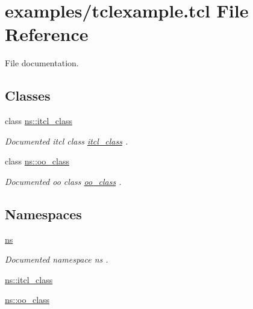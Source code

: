 \hypertarget{tclexample_8tcl}{}\section{examples/tclexample.tcl File Reference}
\label{tclexample_8tcl}


File documentation.  


\subsection*{Classes}
\begin{DoxyCompactItemize}
\item 
class \mbox{\hyperlink{classns_1_1itcl__class}{ns\+::itcl\+\_\+class}}
\begin{DoxyCompactList}\small\item\em Documented itcl class {\ttfamily \mbox{\hyperlink{classns_1_1itcl__class}{itcl\+\_\+class}}} . \end{DoxyCompactList}\item 
class \mbox{\hyperlink{classns_1_1oo__class}{ns\+::oo\+\_\+class}}
\begin{DoxyCompactList}\small\item\em Documented oo class {\ttfamily \mbox{\hyperlink{classns_1_1oo__class}{oo\+\_\+class}}} . \end{DoxyCompactList}\end{DoxyCompactItemize}
\subsection*{Namespaces}
\begin{DoxyCompactItemize}
\item 
 \mbox{\hyperlink{namespacens}{ns}}
\begin{DoxyCompactList}\small\item\em Documented namespace {\ttfamily ns} . \end{DoxyCompactList}\item 
 \mbox{\hyperlink{namespacens_1_1itcl__class}{ns\+::itcl\+\_\+class}}
\item 
 \mbox{\hyperlink{namespacens_1_1oo__class}{ns\+::oo\+\_\+class}}
\end{DoxyCompactItemize}
